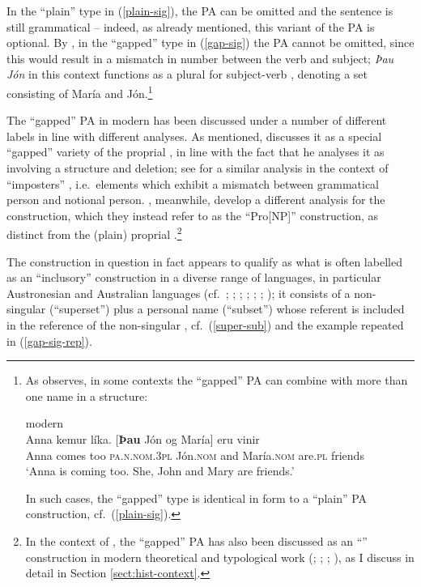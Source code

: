 \documentclass[output=paper,colorlinks,citecolor=brown]{langscibook}
\begin{document}
In the ``plain'' type in (\ref{plain-sig}), the PA can be omitted and the sentence is still grammatical -- indeed, as already mentioned, this variant of the PA is optional. By , in the ``gapped'' type in (\ref{gap-sig}) the PA cannot be omitted, since this would result in a mismatch in number  between the verb and subject; \textit{Þau Jón} in this context functions as a plural for subject-verb , denoting a set consisting of María and Jón.\footnote{As \citet{Sigurdsson2006} observes, in some contexts the ``gapped'' PA can combine with more than one name in a  structure: 

\ea \label{gapped-ambig} modern \\
\gll Anna kemur líka. [\textbf{Þau} Jón og María] eru vinir \\
    Anna comes too \textsc{pa.n.nom.3pl} Jón.\textsc{nom} and María.\textsc{nom} are.\textsc{pl} friends\\
\glt `Anna is coming too. She, John and Mary are friends.'  \citep[229]{Sigurdsson2006}
\z

\noindent In such cases, the ``gapped'' type is identical in form to a ``plain'' PA construction, cf.~(\ref{plain-sig}). 
}

The ``gapped'' PA in modern  has been discussed under a number of different labels in line with different analyses. As mentioned, \citet{Sigurdsson2006} discusses it as a special ``gapped'' variety of the proprial , in line with the fact that he analyses it as involving a  structure and deletion; see \citet{Wood2009} for a similar analysis in the context of ``imposters'' \citep{collins2012imposters}, i.e.~elements which exhibit a mismatch between grammatical person and notional person.
\citet{sigurdhsson2020we}, meanwhile, develop a different analysis for the construction, which they instead refer to as the ``Pro[NP]'' construction, as distinct from the (plain) proprial .\footnote{In the context of , the ``gapped'' PA has also been discussed as an ``'' construction in modern theoretical and typological work (\citealp{denbesten1996associative}; \citealp{moravcsik2003semantic}; \citealp{wals-36}; \citealp{sigurdhsson2020we}), as I discuss in detail in Section \ref{sect:hist-context}.}

The construction in question in fact appears to qualify as what is often labelled as 
an ``inclusory'' construction in a diverse range of languages, in particular Austronesian and Australian languages (cf.~\citealp{lichtenberk2000inclusory}; \citealp{singer2001inclusory}; \citealp{bhat2004conjunction}; \citealp{gaby2005some}; \citealp{haspelmath2007coordination}; \citealp{bril2011noun}; \citealp{schultze2013kriol}); it consists of a non-singular  (``superset'') plus a personal name (``subset'') whose referent is included in the reference of the non-singular , cf.~(\ref{super-sub}) and the example repeated in (\ref{gap-sig-rep}).
\end{document}
